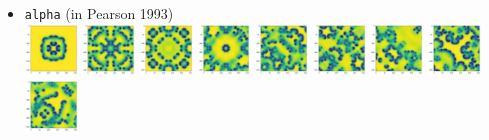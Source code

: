 \begin{itemize}
\item {\tt alpha} (in Pearson 1993)\\
\includegraphics[width=1.4cm]{python_codes/fieldstone_171/pearson93/alpha_solution_0001000_u}
\includegraphics[width=1.4cm]{python_codes/fieldstone_171/pearson93/alpha_solution_0005000_u}
\includegraphics[width=1.4cm]{python_codes/fieldstone_171/pearson93/alpha_solution_0010000_u}
\includegraphics[width=1.4cm]{python_codes/fieldstone_171/pearson93/alpha_solution_0015000_u}
\includegraphics[width=1.4cm]{python_codes/fieldstone_171/pearson93/alpha_solution_0020000_u}
\includegraphics[width=1.4cm]{python_codes/fieldstone_171/pearson93/alpha_solution_0030000_u}
\includegraphics[width=1.4cm]{python_codes/fieldstone_171/pearson93/alpha_solution_0040000_u}
\includegraphics[width=1.4cm]{python_codes/fieldstone_171/pearson93/alpha_solution_0050000_u}
\includegraphics[width=1.4cm]{python_codes/fieldstone_171/pearson93/alpha_solution_0075000_u}

\end{itemize}
